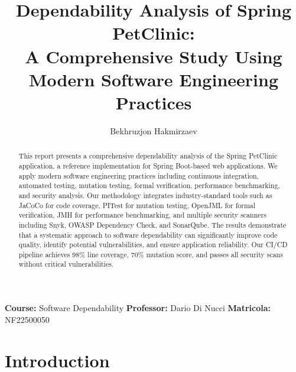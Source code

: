 \documentclass[sigconf]{acmart}
\begin{document}
\title{Dependability Analysis of Spring PetClinic:\\A Comprehensive Study Using Modern Software Engineering Practices}

\author{Bekhruzjon Hakmirzaev}

\renewcommand{\shortauthors}{B. Hakmirzaev (NF22500050)}

\begin{abstract}
This report presents a comprehensive dependability analysis of the Spring PetClinic application, a reference implementation for Spring Boot-based web applications. We apply modern software engineering practices including continuous integration, automated testing, mutation testing, formal verification, performance benchmarking, and security analysis. Our methodology integrates industry-standard tools such as JaCoCo for code coverage, PITest for mutation testing, OpenJML for formal verification, JMH for performance benchmarking, and multiple security scanners including Snyk, OWASP Dependency Check, and SonarQube. The results demonstrate that a systematic approach to software dependability can significantly improve code quality, identify potential vulnerabilities, and ensure application reliability. Our CI/CD pipeline achieves 98\% line coverage, 70\% mutation score, and passes all security scans without critical vulnerabilities.
\end{abstract}


\begin{teaserfigure}
\centering
\textbf{Course:} Software Dependability \hspace{1cm} \textbf{Professor:} Dario Di Nucci \hspace{1cm} \textbf{Matricola:} NF22500050
\end{teaserfigure}

\maketitle

\section{Introduction}
\end{document}
